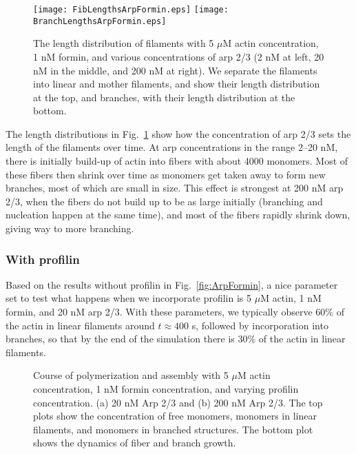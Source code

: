 \documentclass[11pt]{article}
\begin{document}
\begin{figure}
\centering
\texttt{[image: FibLengthsArpFormin.eps]}
\texttt{[image: BranchLengthsArpFormin.eps]}
\caption{\label{fig:LengthDistsArpFormin} The length distribution of filaments with 5 $\mu$M actin concentration, 1 nM formin, and various concentrations of arp 2/3 (2 nM at left, 20 nM in the middle, and 200 nM at right). We separate the filaments into linear and mother filaments, and show their length distribution at the top, and branches, with their length distribution at the bottom. }
\end{figure}

The length distributions in Fig.\ \ref{fig:LengthDistsArpFormin} show how the concentration of arp 2/3 sets the length of the filaments over time. At arp concentrations in the range 2--20 nM, there is initially build-up of actin into fibers with about 4000 monomers. Most of these fibers then shrink over time as monomers get taken away to form new branches, most of which are small in size. This effect is strongest at 200 nM arp 2/3, when the fibers do not build up to be as large initially (branching and nucleation happen at the same time), and most of the fibers rapidly shrink down, giving way to more branching.

\subsubsection{With profilin}
Based on the results without profilin in Fig.\ \ref{fig:ArpFormin}, a nice parameter set to test what happens when we incorporate profilin is 5 $\mu$M actin, 1 nM formin, and 20 nM arp 2/3. With these parameters, we typically observe 60\% of the actin in linear filaments around $ t \approx 400$ s, followed by incorporation into branches, so that by the end of the simulation there is 30\% of the actin in linear filaments.

\begin{figure}
\centering
{}
\caption{\label{fig:Arp20ForminProf}Course of polymerization and assembly with 5 $\mu$M actin concentration, 1 nM formin concentration, and varying profilin concentration. (a) 20 nM Arp 2/3 and (b) 200 nM Arp 2/3. The top plots show the concentration of free monomers, monomers in linear filaments, and monomers in branched structures. The bottom plot shows the dynamics of fiber and branch growth. }
\end{figure}
\end{document}
